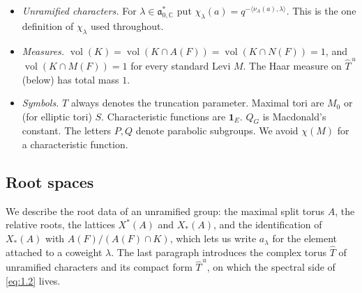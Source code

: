 \documentclass[12pt,letterpaper]{article}
\numberwithin{equation}{section}
\theoremstyle{plain}
\theoremstyle{remark}
\theoremstyle{plain}
\theoremstyle{definition}
\theoremstyle{remark}
\theoremstyle{remark}
\newcommand{\fa}{\mathfrak{a}}
\newcommand{\ip}[1]{\langle #1\rangle}
\newcommand{\Th}{\widehat{T}}
\newcommand{\Thu}{\widehat{T}^{\,u}}
\DeclareMathOperator{\vol}{vol}
\newcommand{\one}{\mathbf 1}
\begin{document}
\begin{itemize}
\item \emph{Unramified characters.} For $\lambda\in\fa_{0,\mathbb{C}}^*$ put $\chi_\lambda(a)=q^{-\ip{\nu_A(a),\lambda}}$. This is the one definition of $\chi_\lambda$ used throughout.
\item \emph{Measures.} $\vol(K)=\vol(K\cap A(F))=\vol(K\cap N(F))=1$, and $\vol(K\cap M(F))=1$ for every standard Levi $M$. The Haar measure on $\Thu$ (below) has total mass $1$.
\item \emph{Symbols.} $T$ always denotes the truncation parameter. Maximal tori are $M_0$ or (for elliptic tori) $S$. Characteristic functions are $\one_E$. $Q_G$ is Macdonald's constant. The letters $P,Q$ denote parabolic subgroups. We avoid $\chi(M)$ for a characteristic function.
\end{itemize}

\subsection{Root spaces}\label{sec:2.1}

We describe the root data of an unramified group: the maximal split torus $A$, the relative roots, the lattices $X^*(A)$ and $X_*(A)$, and the identification of $X_*(A)$ with $A(F)/(A(F)\cap K)$, which lets us write $a_\lambda$ for the element attached to a coweight $\lambda$. The last paragraph introduces the complex torus $\Th$ of unramified characters and its compact form $\Thu$, on which the spectral side of \eqref{eq:1.2} lives.
\end{document}
